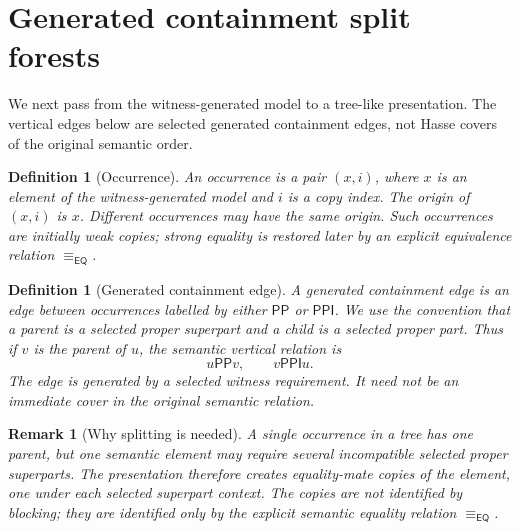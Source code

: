 \documentclass[11pt]{article}
\newtheorem{definition}[theorem]{Definition}
\newtheorem{remark}[theorem]{Remark}
\newcommand{\EQ}{\mathsf{EQ}}
\newcommand{\PP}{\mathsf{PP}}
\newcommand{\PPI}{\mathsf{PPI}}
\newcommand{\eqE}{\equiv_{\EQ}}
\begin{document}
\section{Generated containment split forests}

We next pass from the witness-generated model to a tree-like presentation.  The vertical edges below are selected generated containment edges, not Hasse covers of the original semantic order.

\begin{definition}[Occurrence]
An occurrence is a pair $(x,i)$, where $x$ is an element of the witness-generated model and $i$ is a copy index.  The origin of $(x,i)$ is $x$.  Different occurrences may have the same origin.  Such occurrences are initially weak copies; strong equality is restored later by an explicit equivalence relation $\eqE$.
\end{definition}

\begin{definition}[Generated containment edge]
A generated containment edge is an edge between occurrences labelled by either $\PP$ or $\PPI$.  We use the convention that a parent is a selected proper superpart and a child is a selected proper part.  Thus if $v$ is the parent of $u$, the semantic vertical relation is
\[
  u\PP v,
  \qquad
  v\PPI u.
\]
The edge is generated by a selected witness requirement.  It need not be an immediate cover in the original semantic relation.
\end{definition}

\begin{remark}[Why splitting is needed]
A single occurrence in a tree has one parent, but one semantic element may require several incompatible selected proper superparts.  The presentation therefore creates equality-mate copies of the element, one under each selected superpart context.  The copies are not identified by blocking; they are identified only by the explicit semantic equality relation $\eqE$.
\end{remark}
\end{document}
